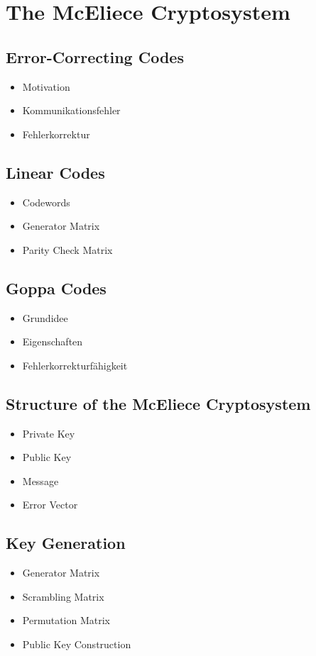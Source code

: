 \documentclass[a4paper,11pt]{article}
\begin{document}
\section{The McEliece Cryptosystem}

\subsection{Error-Correcting Codes}
\begin{itemize}
	\item Motivation
	\item Kommunikationsfehler
	\item Fehlerkorrektur
\end{itemize}

\subsection{Linear Codes}
\begin{itemize}
	\item Codewords
	\item Generator Matrix
	\item Parity Check Matrix
\end{itemize}

\subsection{Goppa Codes}
\begin{itemize}
	\item Grundidee
	\item Eigenschaften
	\item Fehlerkorrekturfähigkeit
\end{itemize}

\subsection{Structure of the McEliece Cryptosystem}
\begin{itemize}
	\item Private Key
	\item Public Key
	\item Message
	\item Error Vector
\end{itemize}

\subsection{Key Generation}
\begin{itemize}
	\item Generator Matrix
	\item Scrambling Matrix
	\item Permutation Matrix
	\item Public Key Construction
\end{itemize}
\end{document}
